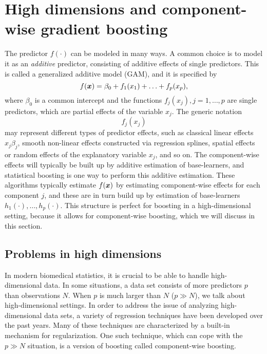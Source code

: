 \section{High dimensions and component-wise gradient boosting}\label{sec:component}
The predictor $f(\cdot)$ can be modeled in many ways.
A common choice is to model it as an \textit{additive} predictor, consisting of additive effects of single predictors.
This is called a generalized additive model (GAM), and it is specified by
\begin{equation}\label{eq:gam}
    f(\bm{x})=\beta_0+f_1(x_1)+\ldots+f_p(x_p),
\end{equation}
where $\beta_0$ is a common intercept and the functions $f_j(x_j),j=1,\ldots,p$ are single predictors, which are partial effects of the variable $x_j$.
The generic notation
\begin{equation*}
    f_j(x_j)
\end{equation*}
may represent different types of predictor effects, such as classical linear effects $x_j\beta_j$, smooth non-linear effects constructed via regression splines, spatial effects or random effects of the explanatory variable $x_j$, and so on. 
The component-wise effects will typically be built up by additive estimation of base-learners, and statistical boosting is one way to perform this additive estimation.
These algorithms typically estimate $f(\bm{x})$ by estimating component-wise effects for each component $j$, and these are in turn build up by estimation of base-learners $h_1(\cdot),\ldots,h_p(\cdot)$.
This structure is perfect for boosting in a high-dimensional setting, because it allows for component-wise boosting, which we will discuss in this section.

\subsection{Problems in high dimensions}
In modern biomedical statistics, it is crucial to be able to handle high-dimensional data.
In some situations, a data set consists of more predictors $p$ than observations $N$.
When $p$ is much larger than $N$ ($p\gg N$), we talk about high-dimensional settings.
In order to address the issue of analyzing high-dimensional data sets, a variety of regression techniques have been developed over the past years.
Many of these techniques are characterized by a built-in mechanism for regularization.
One such technique, which can cope with the $p\gg N$ situation, is a version of boosting called component-wise boosting.

